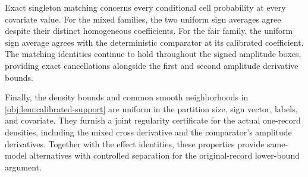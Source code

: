 Exact singleton matching concerns every conditional cell probability at every covariate value. For the mixed families, the two uniform sign averages agree despite their distinct homogeneous coefficients. For the fair family, the uniform sign average agrees with the deterministic comparator at its calibrated coefficient. The matching identities continue to hold throughout the signed amplitude boxes, providing exact cancellations alongside the first and second amplitude derivative bounds.

Finally, the density bounds and common smooth neighborhoods in \cref{obj:lem:calibrated-support} are uniform in the partition size, sign vector, labels, and covariate. They furnish a joint regularity certificate for the actual one-record densities, including the mixed cross derivative and the comparator's amplitude derivatives. Together with the effect identities, these properties provide same-model alternatives with controlled separation for the original-record lower-bound argument.
